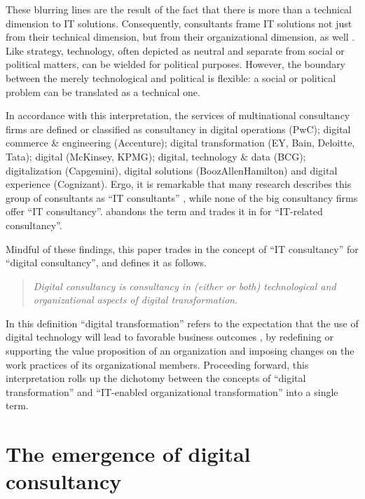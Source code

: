 \documentclass[12pt]{article}
\begin{document}
These blurring lines are the result of the fact that there is more than
a technical dimension to IT solutions. Consequently, consultants frame
IT solutions not just from their technical dimension, but from their
organizational dimension, as well \citep[ 24-25]{bloomfield1995}. Like
strategy, technology, often depicted as neutral and separate from social
or political matters, can be wielded for political purposes. However,
the boundary between the merely technological and political is flexible:
a social or political problem can be translated as a technical one.

In accordance with this interpretation, the services of multinational
consultancy firms are defined or classified as consultancy in digital
operations (PwC); digital commerce \& engineering (Accenture); digital
transformation (EY, Bain, Deloitte, Tata); digital (McKinsey, KPMG);
digital, technology \& data (BCG); digitalization (Capgemini), digital
solutions (BoozAllenHamilton) and digital experience (Cognizant). Ergo,
it is remarkable that many research describes this group of consultants
as ``IT consultants''
\citep{nevo2007, loh1992, fincham2006, armbruster2006, bloomfield1995, schwarz2005},
while none of the big consultancy firms offer ``IT consultancy''.
\citet[96]{czerniawska1999} abandons the term and trades it in for
``IT-related consultancy''.

Mindful of these findings, this paper trades in the concept of ``IT
consultancy'' for ``digital consultancy'', and defines it as follows.

\begin{quote}
\emph{Digital consultancy is consultancy in (either or both)
technological and organizational aspects of digital transformation}.
\end{quote}

In this definition ``digital transformation'' refers to the expectation
that the use of digital technology will lead to favorable business
outcomes \citep[ 104-118]{wessel2020}, by redefining or supporting the
value proposition of an organization and imposing changes on the work
practices of its organizational members. Proceeding forward, this
interpretation rolls up the dichotomy between the concepts of ``digital
transformation'' and ``IT-enabled organizational transformation'' into a
single term.

\section{The emergence of digital
consultancy}\label{the-emergence-of-digital-consultancy}
\end{document}
